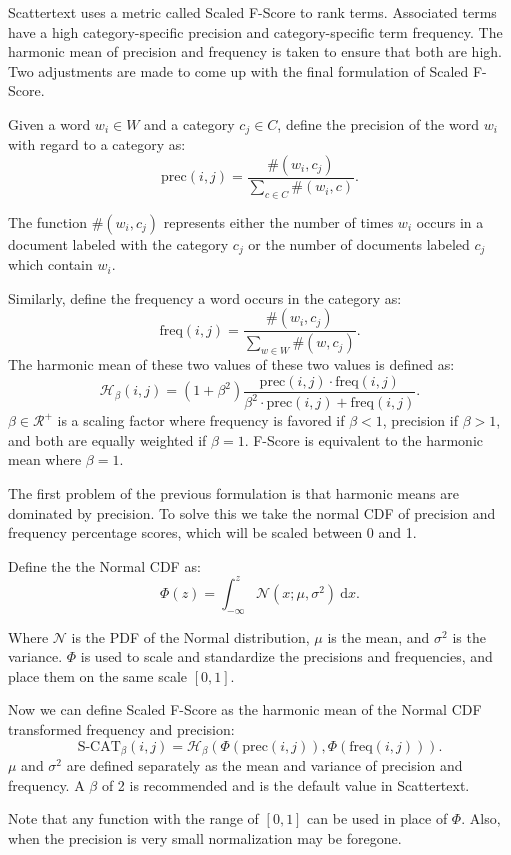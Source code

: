 \documentclass[11pt,a4paper]{article}
\begin{document}
Scattertext uses a metric called Scaled F-Score to rank terms. Associated terms have a high category-specific precision and category-specific term frequency. The harmonic mean of precision and frequency is taken to ensure that both are high. Two adjustments are made to come up with the final formulation of Scaled F-Score.

Given a word $w_i \in W$ and a category $c_j \in C$, define the precision of the word $w_i$ with regard to a category as:
$$ \mbox{prec}(i,j) = \frac{\#(w_i, c_j)}{\sum_{c \in C} \#(w_i, c)}. $$

The function $\#(w_i, c_j)$ represents either the number of times $w_i$ occurs in a document labeled with the category $c_j$ or the number of documents labeled $c_j$ which contain $w_i$.

Similarly, define the frequency a word occurs in the category as:
$$ \mbox{freq}(i, j) = \frac{\#(w_i, c_j)}{\sum_{w \in W} \#(w, c_j)}. $$
The harmonic mean of these two values of these two values is defined as:
$$ \mathcal{H}_\beta(i,j) = (1 + \beta^2) \frac{\mbox{prec}(i,j) \cdot \mbox{freq}(i,j)}{\beta^2 \cdot \mbox{prec}(i,j) + \mbox{freq}(i,j)}. $$
$\beta \in \mathcal{R}^+$ is a scaling factor where frequency is favored if $\beta < 1$, precision if $\beta > 1$, and both are equally weighted if $\beta = 1$. F-Score is equivalent to the harmonic mean where $\beta = 1$.

The first problem of the previous formulation is that harmonic means are dominated by precision. To solve this we take the normal CDF of precision and frequency percentage scores, which will be scaled between 0 and 1.

Define the the Normal CDF as:
$$ \Phi(z) = \int_{-\infty}^z \mathcal{N}(x; \mu, \sigma^2)\ \mathrm{d}x.$$

Where $ \mathcal{N} $ is the PDF of the Normal distribution, $\mu$ is the mean, and $\sigma^2$ is the variance. $\Phi$ is used to scale and standardize the precisions and frequencies, and place them on the same scale $[0,1]$.

Now we can define Scaled F-Score as the harmonic mean of the Normal CDF transformed frequency and precision:
$$ \mbox{S-CAT}_{\beta}(i, j) = \mathcal{H}_{\beta}(\Phi(\mbox{prec}(i, j)), \Phi(\mbox{freq}(i, j))).$$
$\mu$ and $\sigma^2$ are defined separately as the mean and variance of precision and frequency.
A $\beta$ of 2 is recommended and is the default value in Scattertext.

Note that any function with the range of $[0,1]$ can be used in place of $\Phi$.  Also, when the precision is very small normalization may be foregone.
\end{document}
